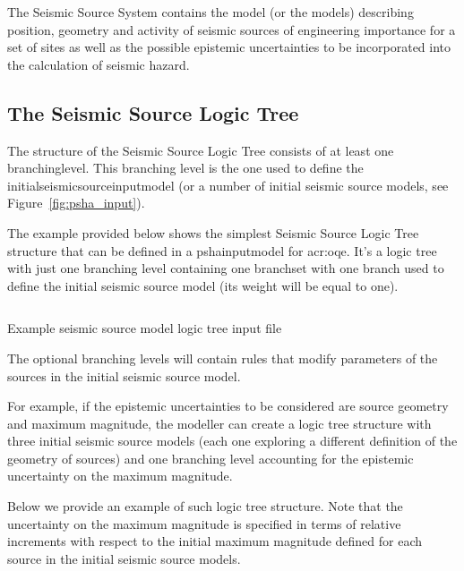 The Seismic Source System contains the model (or the models) describing
position, geometry and activity of seismic sources of engineering importance
for a set of sites as well as the possible epistemic uncertainties to be
incorporated into the calculation of seismic hazard.



\subsection{The Seismic Source Logic Tree}

The structure of the Seismic Source Logic Tree consists of at least one
\gls{branchinglevel}. This branching level is the one used to define the
\gls{initialseismicsourceinputmodel} (or a number of initial seismic source
models, see Figure~\ref{fig:psha_input}).

The example provided below shows the simplest Seismic Source Logic Tree
structure that can be defined in a \gls{pshainputmodel} for \gls{acr:oqe}.
It's a logic tree with just one branching level containing one \gls{branchset}
with one branch used to define the initial seismic source model (its weight
will be equal to one).

\begin{listing}[htbp]
  \inputminted[firstline=1,firstnumber=1,fontsize=\footnotesize,frame=single,linenos,bgcolor=lightgray]{xml}{oqum/hazard/verbatim/input_sslt.xml}
  \caption{Example seismic source model logic tree input file}
  \label{lst:input_sslt}
\end{listing}

The optional branching levels will contain rules that modify parameters of the
sources in the initial seismic source model.

For example, if the epistemic uncertainties to be considered are source
geometry and maximum magnitude, the modeller can create a logic tree structure
with three initial seismic source models (each one exploring a different
definition of the geometry of sources) and one branching level accounting for
the epistemic uncertainty on the maximum magnitude.

Below we provide an example of such logic tree structure. Note that the
uncertainty on the maximum magnitude is specified in terms of relative
increments with respect to the initial maximum magnitude defined for each
source in the initial seismic source models.

\inputminted[firstline=1,firstnumber=1,fontsize=\footnotesize,frame=single,linenos,bgcolor=lightgray]{xml}{oqum/hazard/verbatim/input_sslt_simple_lt.xml}


